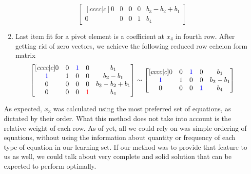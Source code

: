 \begin{enumerate}
\begin{equation}
\begin{bmatrix}[cccc|c]
    0 & 0 & 0 & 0 & b_3 - b_2 + b_1 \\ 
    0 & 0 & 0 & 1 & b_4
\end{bmatrix}
\end{equation}
\item Last item fit for a pivot element is a coefficient at $x_4$ in fourth row.
After getting rid of zero vectors, we achieve the following reduced row echelon form matrix
\begin{equation}
\begin{bmatrix}[cccc|c]
    0 & 0 & \textcolor{blue}{1} & 0 & b_1 \\ 
    \textcolor{blue}{1} & 1 & 0 & 0 & b_2-b_1 \\ 
    0 & 0 & 0 & 0 & b_3 - b_2 + b_1 \\ 
    0 & 0 & 0 & \textcolor{red}{1} & b_4
\end{bmatrix}
\sim
\begin{bmatrix}[cccc|c]
    0 & 0 & \textcolor{blue}{1} & 0 & b_1 \\ 
    \textcolor{blue}{1} & 1 & 0 & 0 & b_2-b_1 \\ 
    0 & 0 & 0 & \textcolor{blue}{1} & b_4
\end{bmatrix}
\end{equation}
\end{enumerate}

As expected, $x_3$ was calculated using the most preferred set of equations, as dictated by their order.
What this method does not take into account is the relative weight of each row.
As of yet, all we could rely on was simple ordering of equations, without using the information about quantity or frequency of each type of equation in our learning set.
If our method was to provide that feature to us as well, we could talk about very complete and solid solution that can be expected to perform optimally.

